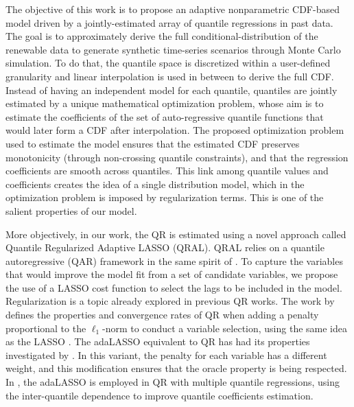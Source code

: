 The objective of this work is to propose an adaptive nonparametric CDF-based model driven by a jointly-estimated array of quantile regressions in past data. The goal is to approximately derive the full conditional-distribution of the renewable data to generate synthetic time-series scenarios through Monte Carlo simulation. To do that, the quantile space is discretized within a user-defined granularity and linear interpolation is used in between to derive the full CDF. Instead of having an independent model for each quantile, quantiles are jointly estimated by a unique mathematical optimization problem, whose aim is to estimate the coefficients of the set of auto-regressive quantile functions that would later form a CDF after interpolation. The proposed optimization problem used to estimate the model ensures that the estimated CDF preserves monotonicity (through non-crossing quantile constraints), and that the regression coefficients are smooth across quantiles. This link among quantile values and coefficients creates the idea of a single distribution model, which in the optimization problem is imposed by regularization terms. This is one of the salient properties of our model.

More objectively, in our work, the QR is estimated using a novel approach called Quantile Regularized Adaptive LASSO (QRAL). QRAL relies on a quantile autoregressive (QAR) framework in the same spirit of \cite{koenker1978regression,koenker_quantile_2006,koenker2005quantile}. To capture the variables that would improve the model fit from a set of candidate variables, we propose the use of a LASSO cost function to select the lags to be included in the model. Regularization is a topic already explored in previous QR works. The work by \cite{belloni_l1-penalized_2009} defines the properties and convergence rates of QR when adding a penalty proportional to the $\ell_1$-norm to conduct a variable selection, using the same idea as the LASSO \cite{tibshirani1996regression}. The adaLASSO equivalent to QR has had its properties investigated by \cite{ciuperca_adaptive_2016}. In this variant, the penalty for each variable has a different weight, and this modification ensures that the oracle property is being respected. In \cite{zou_regularized_2008,jiang_interquantile_2014}, the adaLASSO is employed in QR with multiple quantile regressions, using the inter-quantile dependence to improve quantile coefficients estimation. 

